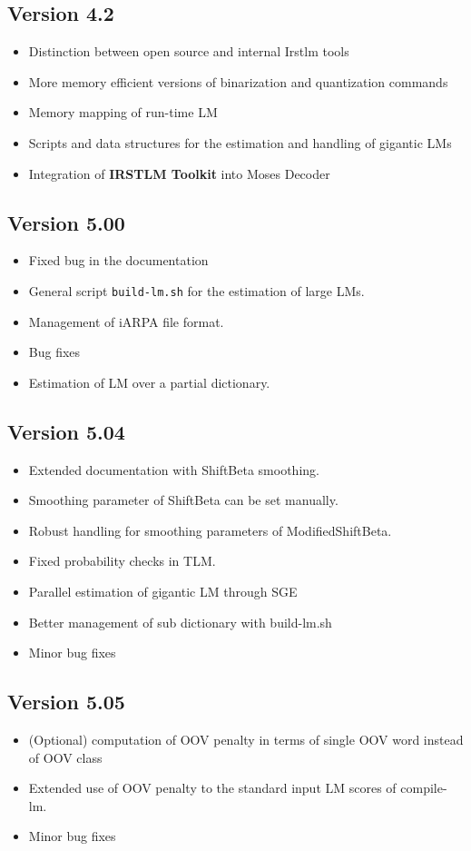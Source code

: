 \documentclass[11pt]{article}
\newcommand{\IRSTLM}{{\bf IRSTLM Toolkit}}
\begin{document}
\subsection{Version 4.2}
\begin{itemize}
\item Distinction between open source and internal Irstlm tools
\item More memory efficient versions of binarization and quantization commands
\item Memory mapping of run-time LM
\item Scripts and data structures for the estimation and handling of gigantic LMs 
\item Integration of {\IRSTLM} into Moses Decoder
\end{itemize}

\subsection{Version 5.00}
\begin{itemize}
\item Fixed bug in the documentation 
\item General script {\tt build-lm.sh} for the estimation of large LMs.
\item Management of iARPA file format.
\item Bug fixes
\item Estimation of LM over a partial dictionary.
\end{itemize}


\subsection{Version 5.04}
\begin{itemize}
\item Extended documentation with ShiftBeta smoothing. 
\item Smoothing parameter of ShiftBeta can be set manually.
\item Robust handling for smoothing parameters of ModifiedShiftBeta.
\item Fixed probability checks in TLM.
\item Parallel estimation of gigantic LM through SGE
\item Better management of sub dictionary with build-lm.sh   
\item Minor bug fixes
\end{itemize}

\subsection{Version 5.05}
\begin{itemize}
\item (Optional) computation of OOV penalty in terms of single OOV word instead of OOV class
\item Extended use of OOV penalty to the standard input LM scores of compile-lm. 
\item Minor bug fixes
\end{itemize}
\end{document}
